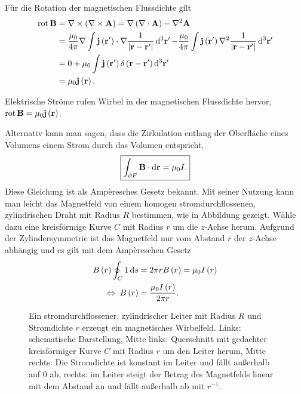 Für die Rotation der magnetischen Flussdichte gilt
\begin{align}
	\begin{split}
		\label{eq:durchflutungsgesetz_magnetostatik}
		\rot \vec {B}&=\nabla \times \left(\nabla \times \vec {A}\right)=\nabla \left(\nabla \cdot \vec {A}\right)-\nabla ^{2}\vec {A}\\
		&=\frac{\mu _{0}}{4\pi }\nabla \int \vec {j}\left(\vec {r}'\right)\cdot \nabla \frac{1}{\left| \vec {r}-\vec {r}'\right| }\diffa[3]{\vec{r}'}-\frac{\mu _{0}}{4\pi }\int \vec {j}\left(\vec {r}'\right)\nabla ^{2}\frac{1}{\left| \vec {r}-\vec {r}'\right| }\diffa[3]{\vec{r}'}\\
		&=0+\mu _{0}\int \vec {j}\left(\vec {r}'\right)\delta \left(\vec {r}-\vec {r}'\right)\diffa[3]{\vec{r}'}\\&=\mu _{0}\vec {j}\left(\vec {r}\right).
	\end{split}
\end{align}

\begin{formal}
	Elektrische Ströme rufen Wirbel in der magnetischen Flussdichte hervor, $\operatorname{rot} \mathbf{B}=\mu _{0}\mathbf{j}\left(\mathbf{r}\right)$.
\end{formal}
Alternativ kann man sagen, dass die Zirkulation entlang der Oberfläche eines Volumens einem Strom durch das Volumen entspricht,
\begin{equation*}
	\boxed{\int _{\partial F}\mathbf{B}\cdot \mathop{}\!\mathrm{d} \mathbf{r}=\mu _{0}I.}
\end{equation*}
Diese Gleichung ist als Ampèresches Gesetz bekannt. Mit seiner Nutzung kann man leicht das Magnetfeld von einem homogen stromdurchflossenen, zylindrischen Draht mit Radius $R$ bestimmen, wie in Abbildung  gezeigt. Wähle dazu eine kreisförmige Kurve $C$ mit Radius $r$ um die $z$-Achse herum. Aufgrund der Zylindersymmetrie ist das Magnetfeld nur vom Abstand $r$ der $z$-Achse abhängig und es gilt mit dem Ampèreschen Gesetz
\begin{align*}
	B\left(r\right)\oint _{C}1\mathop{}\!\mathrm{d} s & =2\pi rB\left(r\right)=\mu _{0}I\left(r\right) \\
	\;\Leftrightarrow\; B\left(r\right)      & =\frac{\mu _{0}I\left(r\right)}{2\pi r}.
\end{align*}


\begin{figure}[htb]
	\centering
	\tfigCylinderConductorJandB
	\caption{Ein stromdurchflossener, zylindrischer Leiter mit Radius $R$ und Stromdichte $r$ erzeugt ein magnetisches Wirbelfeld. Links: schematische Darstellung, Mitte links: Querschnitt mit gedachter kreisförmiger Kurve $C$ mit Radius $r$ um den Leiter herum, Mitte rechts: Die Stromdichte ist konstant im Leiter und fällt außerhalb auf $0$ ab, rechts: im Leiter steigt der Betrag des Magnetfelds linear mit dem Abstand an und fällt außerhalb ab mit $r^{-1}$.  }
	\label{fig:cylinder_conductor_with_diagrams}
\end{figure}

